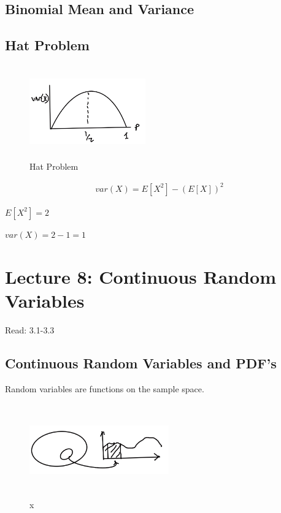\documentclass{article}
\begin{document}


\subsection{Binomial Mean and Variance}

\subsection{Hat Problem}


\begin{figure}[h]
\centering
\includegraphics[width=5cm, height=4cm]{images/L07/bin_hat_problem.jpeg}
\caption{Hat Problem}
\end{figure}


\begin{align*}
var(X) = E[X^2] - (E[X])^2
\end{align*}

$E[X^2]=2$

$var(X)=2-1=1$

\section{Lecture 8: Continuous Random Variables}


Read: 3.1-3.3

\subsection{Continuous Random Variables and PDF's}

Random variables are functions on the sample space.

\begin{figure}[!ht]
\centering
\includegraphics[width=6cm, height=4cm]{images/L08/continuous_rv.jpeg}
\caption{x}
\end{figure}
\end{document}
